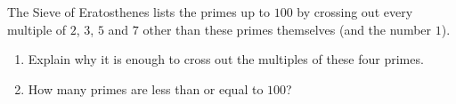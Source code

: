 The Sieve of Eratosthenes lists the primes up to $100$ by crossing out every multiple of $2$, $3$, $5$ and $7$ other than these primes themselves (and the number $1$).
\begin{enumerate}
\item[(a)] Explain why it is enough to cross out the multiples of these four primes.
\item[(b)] How many primes are less than or equal to $100$?
\end{enumerate}
